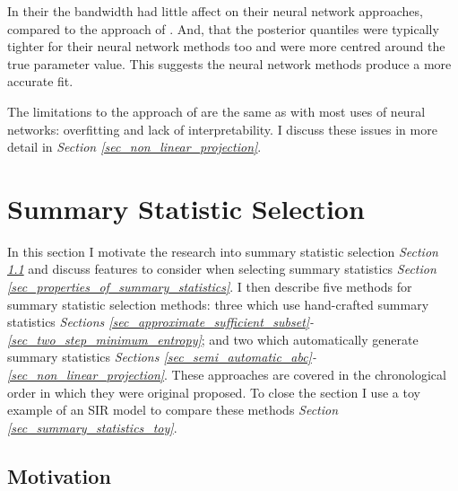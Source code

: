 \documentclass[11pt,a4paper]{article}
\theoremstyle{break}
\begin{document}
  \par In their the bandwidth had little affect on their neural network approaches, compared to the approach of \cite[]{ABC_in_population_genetics}. And, that the posterior quantiles were typically tighter for their neural network methods too and were more centred around the true parameter value. This suggests the neural network methods produce a more accurate fit.

  \par The limitations to the approach of \cite[]{non_linear_regression_models_for_abc} are the same as with most uses of neural networks: overfitting and lack of interpretability. I discuss these issues in more detail in \textit{Section \ref{sec_non_linear_projection}}.

\newpage
\section{Summary Statistic Selection}\label{sec_summary_stats}


  In this section I motivate the research into summary statistic selection \textit{Section \ref{sec_summary_stats_motivation}} and discuss features to consider when selecting summary statistics \textit{Section \ref{sec_properties_of_summary_statistics}}. I then describe five methods for summary statistic selection methods: three which use hand-crafted summary statistics \textit{Sections \ref{sec_approximate_sufficient_subset}-\ref{sec_two_step_minimum_entropy}}; and two which automatically generate summary statistics \textit{Sections \ref{sec_semi_automatic_abc}-\ref{sec_non_linear_projection}}. These approaches are covered in the chronological order in which they were original proposed. To close the section I use a toy example of an SIR model to compare these methods \textit{Section \ref{sec_summary_statistics_toy}}.


\subsection{Motivation}\label{sec_summary_stats_motivation}


\end{document}

